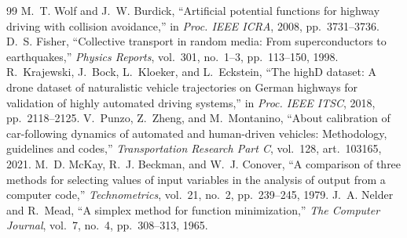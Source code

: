\documentclass[conference,a4paper]{IEEEtran}
\begin{document}
\begin{thebibliography}{99}
 M.~T. Wolf and J.~W. Burdick, ``Artificial potential functions for highway driving with collision avoidance,'' in \emph{Proc. IEEE ICRA}, 2008, pp.~3731--3736.
 D.~S. Fisher, ``Collective transport in random media: From superconductors to earthquakes,'' \emph{Physics Reports}, vol.~301, no.~1--3, pp.~113--150, 1998.
 R.~Krajewski, J.~Bock, L.~Kloeker, and L.~Eckstein, ``The highD dataset: A drone dataset of naturalistic vehicle trajectories on German highways for validation of highly automated driving systems,'' in \emph{Proc. IEEE ITSC}, 2018, pp.~2118--2125.
 V.~Punzo, Z.~Zheng, and M.~Montanino, ``About calibration of car-following dynamics of automated and human-driven vehicles: Methodology, guidelines and codes,'' \emph{Transportation Research Part C}, vol.~128, art.~103165, 2021.
 M.~D. McKay, R.~J. Beckman, and W.~J. Conover, ``A comparison of three methods for selecting values of input variables in the analysis of output from a computer code,'' \emph{Technometrics}, vol.~21, no.~2, pp.~239--245, 1979.
 J.~A. Nelder and R.~Mead, ``A simplex method for function minimization,'' \emph{The Computer Journal}, vol.~7, no.~4, pp.~308--313, 1965.
\end{thebibliography}
\end{document}
